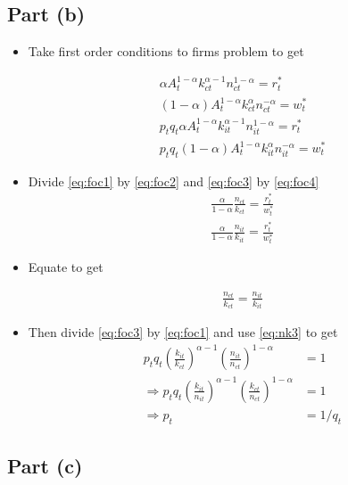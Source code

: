 \documentclass{scrartcl}
\begin{document}
\subsection*{Part (b)}

\begin{itemize}
	\item Take first order conditions to firms problem to get
	
	\begin{align}
	\alpha A_t ^{1-\alpha} k_{ct}^{\alpha-1} n_{ct}^{1-\alpha}=r_t^* \label{eq:foc1} \\
	(1-\alpha) A_t ^{1-\alpha} k_{ct}^{\alpha} n_{ct}^{-\alpha}=w_t^* \label{eq:foc2} \\
	p_t q_t \alpha A_t ^{1-\alpha} k_{it}^{\alpha-1} n_{it}^{1-\alpha}=r_t^* \label{eq:foc3} \\
	p_t q_t (1-\alpha) A_t ^{1-\alpha} k_{it}^{\alpha} n_{it}^{-\alpha}=w_t^* \label{eq:foc4}
	\end{align}
	
	\item Divide \eqref{eq:foc1} by \eqref{eq:foc2} and \eqref{eq:foc3} by \eqref{eq:foc4} 
	\begin{align}
	\frac{\alpha}{1-\alpha}\frac{n_{ct}}{k_{ct}}=\frac{r^*_t}{w^*_t} \label{eq:nk1} \\
	\frac{\alpha}{1-\alpha}\frac{n_{it}}{k_{it}}=\frac{r^*_t}{w^*_t} \label{eq:nk2}
	\end{align}
	
	\item Equate to get
	
	\begin{align}
	\frac{n_{ct}}{k_{ct}}=\frac{n_{it}}{k_{it}} \label{eq:nk3}
	\end{align}
	
	\item Then divide \eqref{eq:foc3} by \eqref{eq:foc1} and use \eqref{eq:nk3} to get
	\begin{align}
	p_t q_t \left(\frac{k_{it}}{k_{ct}}\right)^{\alpha-1} \left(\frac{n_{it}}{n_{ct}}\right)^{1-\alpha}&=1 \nonumber \\
	\Rightarrow p_t q_t \left( \frac{k_{it}}{n_{it}}\right)^{\alpha-1} \left( \frac{k_{ct}}{n_{ct}}\right)^{1-\alpha}&=1 \nonumber \\
	\Rightarrow p_t &= 1/q_t \label{eq:pq}
	\end{align}

	
\end{itemize}

\subsection*{Part (c)}
\end{document}
